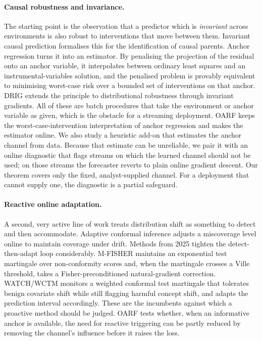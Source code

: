 \documentclass[11pt]{article}
\theoremstyle{plain}
\theoremstyle{remark}
\newcommand{\OARF}{\textsc{OARF}}
\begin{document}
\paragraph{Causal robustness and invariance.} The starting point is the observation
that a predictor which is \emph{invariant} across environments is also robust to
interventions that move between them. Invariant causal prediction
\citep{peters2016invariant} formalises this for the identification of causal
parents. Anchor regression \citep{rothenhausler2021anchor} turns it into an
estimator. By penalising the projection of the residual onto an anchor variable, it
interpolates between ordinary least squares and an instrumental-variables solution,
and the penalised problem is provably equivalent to minimising worst-case risk over
a bounded set of interventions on that anchor. DRIG \citep{shen2023drig} extends
the principle to distributional robustness through invariant gradients. All of
these are batch procedures that take the environment or anchor variable as given,
which is the obstacle for a streaming deployment. \OARF{} keeps the
worst-case-intervention interpretation of anchor regression and makes the estimator
online. We also study a heuristic add-on that estimates the anchor channel from
data. Because that estimate can be unreliable, we pair it with an online diagnostic
that flags streams on which the learned channel should not be used; on those streams
the forecaster reverts to plain online gradient descent. Our theorem covers only the
fixed, analyst-supplied channel. For a deployment that cannot supply one, the
diagnostic is a partial safeguard.

\paragraph{Reactive online adaptation.} A second, very active line of work treats
distribution shift as something to detect and then accommodate. Adaptive conformal
inference \citep{gibbs2021aci} adjusts a miscoverage level online to maintain
coverage under drift. Methods from 2025 tighten the detect-then-adapt loop
considerably. M-FISHER \citep{mfisher2025} maintains an exponential test martingale
over non-conformity scores and, when the martingale crosses a Ville threshold,
takes a Fisher-preconditioned natural-gradient correction. WATCH/WCTM
\citep{watch2025} monitors a weighted conformal test martingale that tolerates
benign covariate shift while still flagging harmful concept shift, and adapts the
prediction interval accordingly. These are the incumbents against which a proactive
method should be judged. \OARF{} tests whether, when an informative anchor is
available, the need for reactive triggering can be partly reduced by removing the
channel's influence before it raises the loss.
\end{document}
